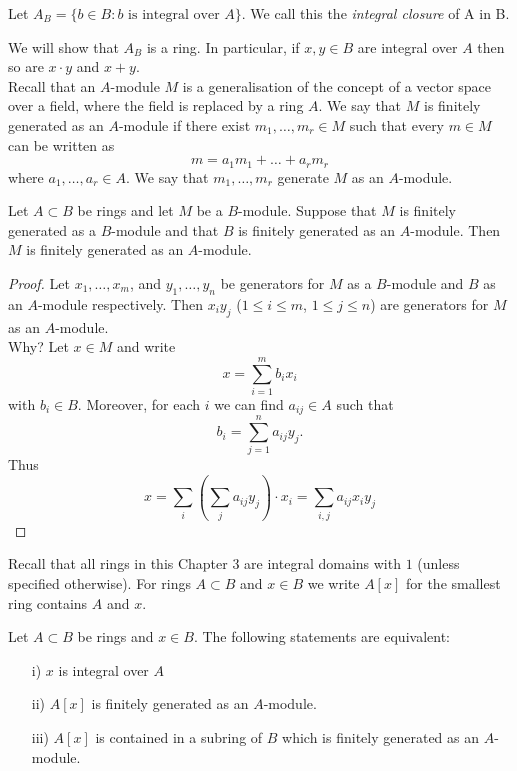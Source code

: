 \documentclass[NumTh.tex]{subfiles}
\begin{document}
Let $A_B = \{ b \in B : b \text{ is integral over } A\}$.
We call this the \emph{integral closure} of A in B.

We will show that $A_B$ is a ring.
In particular, if $x,y \in B$ are integral over $A$ then so are $x \cdot y$ and $x + y$.
\\

Recall that an $A$-module $M$ is a generalisation of the concept of a vector space over a field, where the field is replaced by a ring $A$.
We say that $M$ is finitely generated as an $A$-module if there exist $m_1,\dots,m_r \in M$ such that every $m \in M$ can be written as 
\[ m = a_1 m_1 + \dots + a_r m_r \]
where $a_1,\dots,a_r \in A$.
We say that $m_1,\dots,m_r$ generate $M$ as an $A$-module.


\begin{lemma}\label{l_3_3_1}
  Let $A \subset B$ be rings and let $M$ be a $B$-module.
  Suppose that $M$ is finitely generated as a $B$-module and that $B$ is finitely generated as an $A$-module.
  Then $M$ is finitely generated as an $A$-module.
\end{lemma}

\begin{proof}
  Let $x_1,\dots,x_m$, and $y_1,\dots,y_n$ be generators for $M$ as a $B$-module and $B$ as an $A$-module respectively.
  Then $x_i y_j$ ($1 \leq i \leq m$, $1 \leq j \leq n$) are generators for $M$ as an $A$-module. \\
  Why?
  Let $x \in M$ and write 
  \[ x = \sum_{i=1}^m b_i x_i \] 
  with $b_i \in B$.
  Moreover, for each $i$ we can find $a_{ij} \in A$ such that
  \[ b_i = \sum_{j=1}^n a_{ij} y_j \text{.} \]
  Thus
  \[ x = \sum_i \left( \sum_j a_{ij} y_j \right) \cdot x_i = \sum_{i,j} a_{ij}x_i y_j\]
\end{proof}

Recall that all rings in this Chapter 3 are integral domains with $1$ (unless specified otherwise).
For rings $A \subset B$ and $x \in B$ we write $A[x]$ for the smallest ring contains $A$ and $x$.

\begin{theorem}\label{th_3_3_2}
  Let $A \subset B$ be rings and $x \in B$.
  The following statements are equivalent:
  \begin{enumerate}
    \item[i)] $x$ is integral over $A$
    \item[ii)] $A[x]$ is finitely generated as an $A$-module.
    \item[iii)] $A[x]$ is contained in a subring of $B$ which is finitely generated as an $A$-module.
  \end{enumerate}
\end{theorem}
\end{document}
